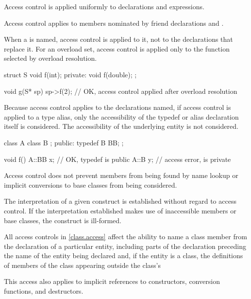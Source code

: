 \pnum
Access control is applied uniformly to declarations and expressions.
\begin{note}
Access control applies to members nominated by
friend declarations and
.
\end{note}
When a  is named,
access control is applied to it, not to the declarations that replace it.
For an overload set, access control is applied only to
the function selected by overload resolution.
\begin{example}
\begin{codeblock}
struct S {
  void f(int);
private:
  void f(double);
};

void g(S* sp) {
  sp->f(2);         // OK, access control applied after overload resolution
}
\end{codeblock}
\end{example}
\begin{note}
Because access control applies to the declarations named,
if access control is applied to a type alias,
only the accessibility of the typedef or alias declaration itself is considered.
The accessibility of the underlying entity is not considered.
\begin{example}
\begin{codeblock}
class A {
  class B { };
public:
  typedef B BB;
};

void f() {
  A::BB x;          // OK, typedef  is public
  A::B y;           // access error,  is private
}
\end{codeblock}
\end{example}
\end{note}

\pnum
\begin{note}
Access control does not prevent members from being found by name lookup or
implicit conversions to base classes from being considered.
\end{note}
The interpretation of a given construct is
established without regard to access control.
If the interpretation
established makes use of inaccessible members or base classes,
the construct is ill-formed.

\pnum
All access controls in \ref{class.access} affect the ability to name a class member
from the declaration of a particular
entity, including parts of the declaration preceding the name of the entity
being declared and, if the entity is a class, the definitions of members of
the class appearing outside the class's 
\begin{note}
This access also applies to implicit references to constructors,
conversion functions, and destructors.
\end{note}

